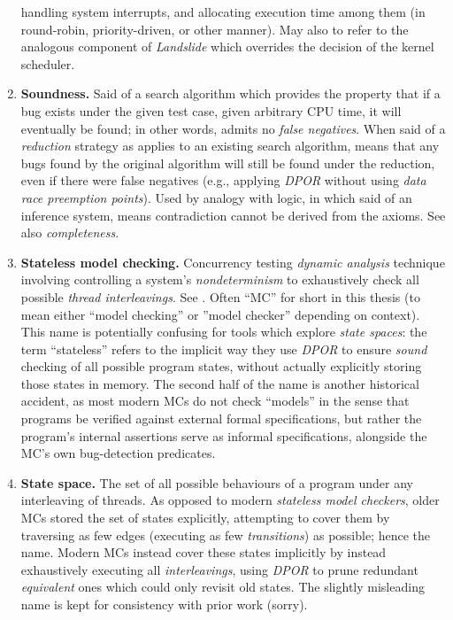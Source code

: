 \begin{enumerate}
		handling system interrupts,
		and allocating execution time among them (in round-robin, priority-driven, or other manner).
		May also to refer to the analogous component of {\em Landslide}
		which overrides the decision of the kernel scheduler.
	\item {\bf Soundness.}
		Said of a search algorithm
		which provides the property that if a bug exists under the given test case,
		given arbitrary CPU time,
		it will eventually be found;
		in other words, admits no {\em false negatives}.
		When said of a {\em reduction} strategy as applies to an existing search algorithm,
		means that any bugs found by the original algorithm will still be found under the reduction,
		even if there were false negatives
		(e.g., applying {\em DPOR} without using {\em data race preemption points}).
		Used by analogy with logic, in which said of an inference system,
		means contradiction cannot be derived from the axioms.
		See also {\em completeness}.
	\item {\bf Stateless model checking.}
		Concurrency testing {\em dynamic analysis} technique involving controlling a system's {\em nondeterminism}
		to exhaustively check all possible {\em thread interleavings}.
		See \sect{\ref{sec:overview-stateless}}.
		Often ``MC'' for short in this thesis (to mean either ``model checking'' or ''model checker'' depending on context).
		This name is potentially confusing for tools which explore {\em state spaces}:
		the term ``stateless'' refers to the implicit way they use {\em DPOR} to ensure {\em sound} checking
		of all possible program states, without actually explicitly storing those states in memory.
		The second half of the name is another historical accident,
		as most modern MCs do not check ``models'' in the sense that
		programs be verified against external formal specifications,
		but rather the program's internal assertions serve as informal specifications,
		alongside the MC's own bug-detection predicates.
	\item {\bf State space.}
		The set of all possible behaviours of a program under any interleaving of threads.
		As opposed to modern {\em stateless model checkers}, older MCs stored the set of states explicitly,
		attempting to cover them by traversing as few edges (executing as few {\em transitions}) as possible;
		hence the name.
		Modern MCs instead cover these states implicitly by instead exhaustively executing all {\em interleavings},
		using {\em DPOR} to prune redundant {\em equivalent} ones which could only revisit old states.
		The slightly misleading name is kept for consistency with prior work (sorry).

\end{enumerate}
